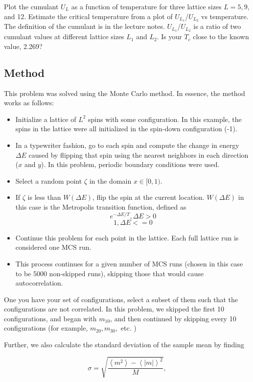\documentclass[10pt,letter]{article}
\begin{document}
Plot the cumulant $U_L$ as a function of temperature for three lattice sizes $L = 5, 9, $ and 12. Estimate
the critical temperature from a plot of $U_{L_1}$/$U_{L_2}$ vs temperature. The definition of the cumulant is
in the lecture notes. $U_{L_1}$/$U_{L_2}$
is a ratio of two cumulant values at different lattice sizes $L_1$ and $L_2$.
Is your $T_c$ close to the known value, 2.269?


\subsection{Method}

This problem was solved using the Monte Carlo method. In essence, the method works as follows:

\begin{itemize}
\item Initialize a lattice of $L^2$ spins with some configuration. In this example, the spins in the lattice were all initialized in the spin-down configuration (-1).
\item In a typewriter fashion, go to each spin and compute the change in energy $\Delta E$ caused by flipping that spin using the nearest neighbors in each direction ($x$ and $y$). In this problem, periodic boundary conditions were used.
\item Select a random point $\zeta$ in the domain $x \in [0,1)$.
\item If $\zeta$ is less than $W(\Delta E)$, flip the spin at the current location. $W(\Delta E)$ in this case is the Metropolis transition function, defined as
$$e^{-\Delta E/T}, \Delta E>0$$
$$1, \Delta E<=0$$
\item Continue this problem for each point in the lattice. Each full lattice run is considered one MCS run.
\item This process continues for a given number of MCS runs (chosen in this case to be 5000 non-skipped runs), skipping those that would cause autocorrelation.
\end{itemize}

One you have your set of configurations, select a subset of them such that the configurations are not correlated. In this problem, we skipped the first 10 configurations, and began with $m_10$, and then continued by skipping every 10 configurations (for example, $m_{20}, m_{30},$ etc. )

Further, we also calculate the standard deviation of the sample mean by finding 

$$ \sigma = \sqrt{ \frac{\left\langle m^2 \right\rangle - \left\langle |m| \right\rangle^2}{M}},$$
\end{document}
